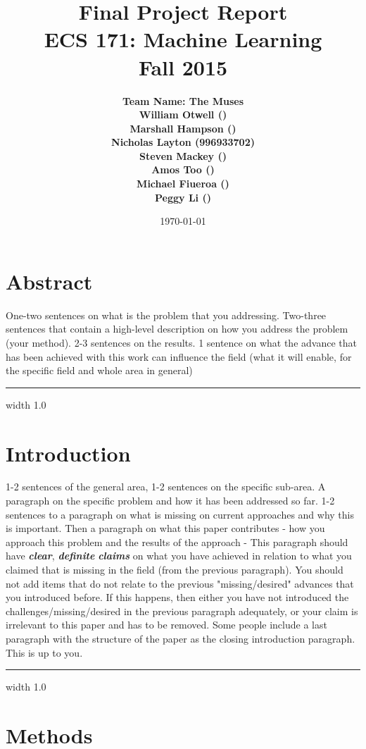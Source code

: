 \documentclass[12pt]{article}
\title{\vspace{-3ex}\bf Final Project Report\\[2ex] 
       \normalsize ECS 171: Machine Learning\\Fall 2015}
\date{\today}
\author{\bf Team Name: The Muses\\ \bf William Otwell ()\\ \bf Marshall Hampson ()\\ \bf Nicholas Layton (996933702)\\ \bf Steven Mackey ()\\ \bf Amos Too ()\\ \bf Michael Fiueroa ()\\ \bf Peggy Li ()}
\newcommand{\horizontalLine}{
	\begin{center}
		\hrule width 1.0\textwidth
	\end{center}
}
\begin{document}
\maketitle
\pagebreak
\tableofcontents
\pagebreak

\section{Abstract}
\label{sec:abstract}
One-two sentences on what is the problem that you addressing. Two-three sentences
that contain a high-level description on how you address the problem (your method). 2-3 sentences
on the results. 1 sentence on what the advance that has been achieved with this work
can influence the field (what it will enable, for the specific field and whole area in general)

\horizontalLine
\section{Introduction}
\label{sec:introduction}
1-2 sentences of the general area, 1-2 sentences on the specific sub-area. A paragraph
on the specific problem and how it has been addressed so far. 1-2 sentences to a paragraph
on what is missing on current approaches and why this is important.
Then a paragraph on what this paper contributes - how you approach this problem and the
results of the approach - This paragraph should have \textbf{\textit{clear}}, \textbf{\textit{definite}} \textbf{\textit{claims}} on what you have
achieved in relation to what you claimed that is missing in the field (from the previous paragraph).
You should not add items that do not relate to the previous "missing/desired" advances
that you introduced before. If this happens, then either you have not introduced the challenges/missing/desired
in the previous paragraph adequately, or your claim is irrelevant to this
paper and has to be removed.
Some people include a last paragraph with the structure of the paper as the closing introduction
paragraph. This is up to you.

\horizontalLine
\section{Methods}
\label{sec:methods}
\end{document}
